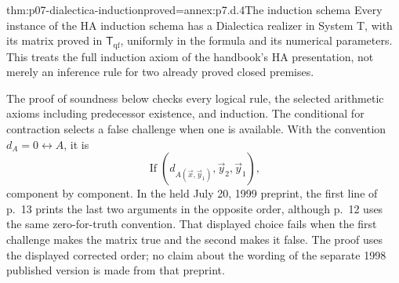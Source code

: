 \begin{hblemma}{thm:p07-dialectica-induction}{proved=annex:p7.d.4}{The induction schema}
Every instance of the HA induction schema has a Dialectica realizer
in System T, with its matrix proved in
\(\mathsf T_{\mathrm{qf}}\), uniformly in the formula and its
numerical parameters. This treats the full induction axiom of the
handbook's HA presentation, not merely an inference rule for two
already proved closed premises.
\end{hblemma}

The proof of soundness below checks every logical rule, the selected
arithmetic axioms including predecessor existence, and induction.
The conditional for contraction selects a false challenge when one
is available. With the convention \(d_A=0\leftrightarrow A\), it is
\[
 \operatorname{If}(d_{A(\vec x,\vec y_1)},\vec y_2,\vec y_1),
\]
component by component. In the held July 20, 1999 preprint, the first
line of p.~13 prints the last two arguments in the opposite order,
although p.~12 uses the same zero-for-truth convention. That displayed
choice fails when the first challenge makes the matrix true and the
second makes it false. The proof uses the displayed corrected order;
no claim about the wording of the separate 1998 published version is
made from that preprint.
